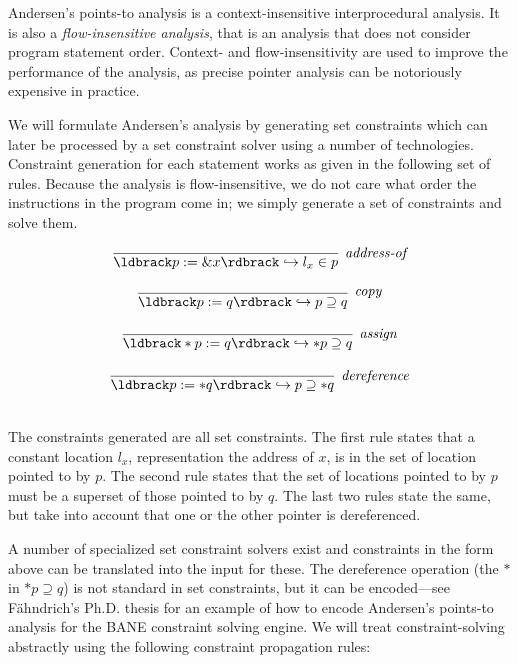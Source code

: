 \documentclass[11pt]{article}
\newcommand{\parg}[1] %
  {\ldbrack #1 \rdbrack}
\begin{document}
\begin{sloppypar}
Andersen's points-to analysis is a context-insensitive interprocedural analysis.  It is also a \textit{flow-insensitive analysis}, that is an analysis that does not consider program statement order.  Context- and flow-insensitivity are used to improve the performance of the analysis, as precise pointer analysis can be notoriously expensive in practice.

We will formulate Andersen's analysis by generating set constraints which can later be processed by a set constraint solver using a number of technologies.  Constraint generation for each statement works as given in the following set of rules.  Because the analysis is flow-insensitive, we do not care what order the instructions in the program come in; we simply generate a set of constraints and solve them.

\[
\begin{array}{c}
\infer[\textit{address-of}]
	{\parg{p := \&x} \hookrightarrow l_x \in p}
	{}\\[3ex]
	
\infer[\textit{copy}]
	{\parg{p := q} \hookrightarrow p \supseteq q}
	{}\\[3ex]
	
\infer[\textit{assign}]
	{\parg{*p := q} \hookrightarrow *p \supseteq q}
	{}\\[3ex]
	
\infer[\textit{dereference}]
	{\parg{p := *q} \hookrightarrow p \supseteq *q}
	{}\\[3ex]
	
\end{array}
\]

The constraints generated are all set constraints.  The first rule states that a constant location $l_x$, representation the address of $x$, is in the set of location pointed to by $p$.  The second rule states that the set of locations pointed to by $p$ must be a superset of those pointed to by $q$.  The last two rules state the same, but take into account that one or the other pointer is dereferenced.

A number of specialized set constraint solvers exist and constraints in the form above can be translated into the input for these.  The dereference operation (the $*$ in $*p \supseteq q$) is not standard in set constraints, but it can be encoded---see F\"ahndrich's Ph.D. thesis for an example of how to encode Andersen's points-to analysis for the BANE constraint solving engine.  We will treat constraint-solving abstractly using the following constraint propagation rules:


\end{sloppypar}
\end{document}
